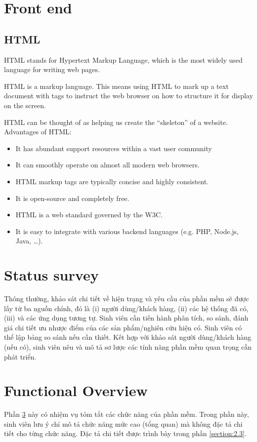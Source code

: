 \documentclass[../Main.tex]{subfiles}
\begin{document}
\section{Front end}

\subsection{HTML}

HTML stands for Hypertext Markup Language, which is the most widely used language for writing web pages.

HTML is a markup language.
This means using HTML to mark up a text document with tags to instruct the web browser on how to structure it for display on the screen.

HTML can be thought of as helping us create the ``skeleton'' of a website.
Advantages of HTML:

\begin{itemize}
    \item It has abundant support resources within a vast user community
    \item It can smoothly operate on almost all modern web browsers.
    \item HTML markup tags are typically concise and highly consistent.
    \item It is open-source and completely free.
    \item HTML is a web standard governed by the W3C.
    \item It is easy to integrate with various backend languages (e.g. PHP, Node.js, Java, \dots).
\end{itemize}

\section{Status survey}
\label{section:2.1}
Thông thường, khảo sát chi tiết về hiện trạng và yêu cầu của phần mềm sẽ được lấy từ ba nguồn chính, đó là (i) người dùng/khách hàng, (ii) các hệ thống đã có, (iii) và các ứng dụng tương tự.
Sinh viên cần tiến hành phân tích, so sánh, đánh giá chi tiết ưu nhược điểm của các sản phẩm/nghiên cứu hiện có.
Sinh viên có thể lập bảng so sánh nếu cần thiết.
Kết hợp với khảo sát người dùng/khách hàng (nếu có), sinh viên nêu và mô tả sơ lược các tính năng phần mềm quan trọng cần phát triển.

\section{Functional Overview}
\label{section:2.2}
Phần \ref{section:2.2} này có nhiệm vụ tóm tắt các chức năng của phần mềm.
Trong phần này, sinh viên lưu ý chỉ mô tả chức năng mức cao (tổng quan) mà không đặc tả chi tiết cho từng chức năng.
Đặc tả chi tiết được trình bày trong phần \ref{section:2.3}.
\end{document}
